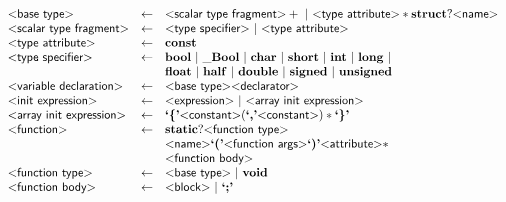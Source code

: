\begin{figure}
\[\begin{array}{lcl}
  \text{\sf\textless base type\textgreater} & \gets & \text{\sf\textless scalar type fragment\textgreater}+
                               ~|~ \text{\sf\textless type attribute\textgreater}* \mathbf{struct}? \text{\sf\textless name\textgreater}\\


  \text{\sf\textless scalar type fragment\textgreater} & \gets & \text{\sf\textless type specifier\textgreater} ~|~ \text{\sf\textless type attribute\textgreater} \\

  \text{\sf\textless type attribute\textgreater} & \gets & \mathbf{const} \\

  \text{\sf\textless type specifier\textgreater} & \gets & \mathbf{bool}
                                    ~|~ \mathbf{\_Bool}
                                    ~|~ \mathbf{char}
                                    ~|~ \mathbf{short}
                                    ~|~ \mathbf{int}
                                    ~|~ \mathbf{long} ~|~\\&&
                                         \mathbf{float}
                                    ~|~ \mathbf{half}
                                    ~|~ \mathbf{double}
                                    ~|~ \mathbf{signed}
                                    ~|~ \mathbf{unsigned}
  \\

  \text{\sf\textless variable declaration\textgreater} & \gets & \text{\sf\textless base type\textgreater} \text{\sf\textless declarator\textgreater}
  \\

  \text{\sf\textless init expression\textgreater} & \gets & \text{\sf\textless expression\textgreater} ~|~ \text{\sf\textless array init expression\textgreater} \\

  \text{\sf\textless array init expression\textgreater} & \gets & \text{\bf`\{'} \text{\sf\textless constant\textgreater}
                                                        (\text{\bf`,'} \text{\sf\textless constant\textgreater})*
                                             \text{\bf`\}'}
  \\
  \text{\sf\textless function\textgreater} & \gets & \mathbf{static}? \text{\sf\textless function type\textgreater} \\
                                & & \text{\sf\textless name\textgreater}
                                \text{\bf`('} \text{\sf\textless function args\textgreater} \text{\bf`)'} \text{\sf\textless attribute\textgreater}*\\
                                & & \text{\sf\textless function body\textgreater}
  \\
  \text{\sf\textless function type\textgreater} & \gets & \text{\sf\textless base type\textgreater} ~|~ \mathbf{void} \\

  \text{\sf\textless function body\textgreater} & \gets & \text{\sf\textless block\textgreater} ~|~ \text{\bf`;'}\\


\end{array}\]
\end{figure}

